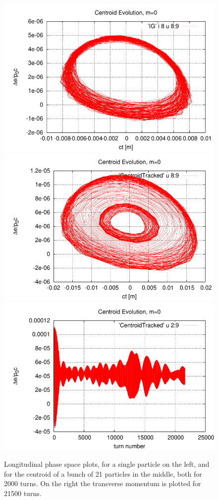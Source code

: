 \documentclass[12]{article}
\begin{document}
\begin{figure}[h]
\centering
\includegraphics[scale=0.41]{SingleParticleTrack-longit.pdf}
\includegraphics[scale=0.41]{CentroidTrack-longit.pdf}
\includegraphics[scale=0.41]{CentroidTrack-mom.pdf}
\caption{\label{fig:Centroid}Longitudinal phase space plots, for
a single particle on the left, and for the centroid of a bunch
of 21 particles in the middle, both for 2000 turns. On the right 
the transverse momentum is plotted for 21500 turns.} 
\end{figure}
\end{document}
